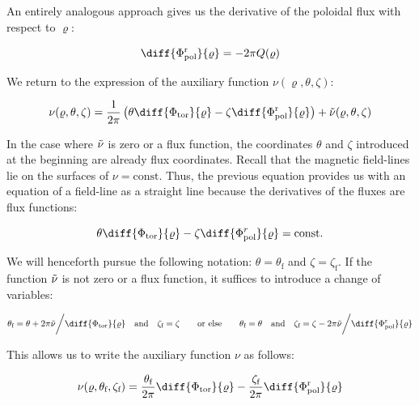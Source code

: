 An entirely analogous approach gives us the derivative of the poloidal flux with respect to $\varrho$:

\begin{equation}
    \diff{\Phi_\text{pol}^\text{r}}{\varrho}=-2\pi Q(\varrho)
\end{equation}

We return to the expression of the auxiliary function $\nu(\varrho, \theta, \zeta)$:

\begin{equation}
    \label{eq-5-51}
    \nu(\varrho, \theta, \zeta)=\frac{1}{2\pi}\left(\theta\diff{\Phi_\text{tor}}{\varrho}-\zeta\diff{\Phi_\text{pol}^\text{r}}{\varrho}\right)+\Tilde{\nu}(\varrho, \theta, \zeta)
\end{equation}

In the case where $\Tilde{\nu}$ is zero or a flux function, the coordinates $\theta$ and $\zeta$ introduced at the beginning are already flux coordinates. Recall that the magnetic field-lines lie on the surfaces of $\nu=\text{const}$. Thus, the previous equation provides us with an equation of a field-line as a straight line because the derivatives of the fluxes are flux functions:

\begin{equation}
    \theta\diff{\Phi_\text{tor}}{\varrho}-\zeta\diff{\Phi_\text{pol}^{r}}{\varrho}=\text{const.}
\end{equation}

We will henceforth pursue the following notation: $\theta=\theta_\text{f}$ and $\zeta=\zeta_\text{f}$. If the function $\Tilde{\nu}$ is not zero or a flux function, it suffices to introduce a change of variables:

\begin{equation}
    \label{eq-5-53}
    \theta_\text{f}=\theta+2\pi\Tilde{\nu}\bigg/\diff{\Phi_\text{tor}}{\varrho}\quad\text{and}\quad\zeta_\text{f}=\zeta\quad\quad\text{or else}\quad\quad\theta_\text{f}=\theta\quad\text{and}\quad\zeta_\text{f}=\zeta-2\pi\Tilde{\nu}\bigg/\diff{\Phi_\text{pol}^\text{r}}{\varrho}
\end{equation}

This allows us to write the auxiliary function $\nu$ as follows:

\begin{equation}
    \nu(\varrho, \theta_\text{f}, \zeta_\text{f})=\frac{\theta_\text{f}}{2\pi}\diff{\Phi_\text{tor}}{\varrho}-\frac{\zeta_\text{f}}{2\pi}\diff{\Phi_\text{pol}^\text{r}}{\varrho}
\end{equation}

